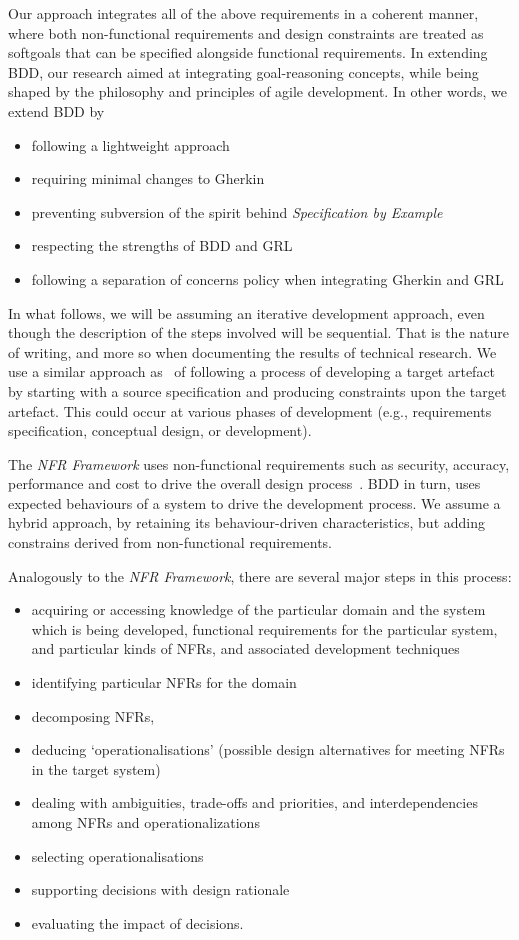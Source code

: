 \documentclass[dissertation,final]{softeng}
\begin{document}
Our approach integrates all of the above requirements in a coherent manner, where both non-functional requirements and design constraints are treated as softgoals that can be specified alongside functional requirements. In extending BDD, our research aimed at integrating goal-reasoning concepts, while being shaped by the philosophy and principles of agile development. In other words, we extend BDD by 

\begin{itemize}
\item following a lightweight approach
\item requiring minimal changes to Gherkin
\item preventing subversion of the spirit behind \emph{Specification by Example}
\item respecting the strengths of BDD and GRL
\item following a separation of concerns policy when integrating Gherkin and GRL
\end{itemize}

In what follows, we will be assuming an iterative development approach, even though the description of the steps involved will be sequential. That is the nature of writing, and more so when documenting the results of technical research. We use a similar approach as~\citet{Chung2000} of following a process of developing a target artefact by starting with a source specification and producing constraints upon the target artefact. This could occur at various phases of development (e.g., requirements specification, conceptual design, or development).

The \emph{NFR Framework} uses non-functional requirements such as security, accuracy, performance and cost to drive the overall design process~\citep{Chung2000}. BDD in turn, uses expected behaviours of a system to drive the development process. We assume a hybrid approach, by retaining its behaviour-driven characteristics, but adding constrains derived from non-functional requirements.
\clearpage

Analogously to the \emph{NFR Framework}, there are several major steps in this process:
\begin{itemize}
\item acquiring or accessing knowledge of the particular domain and the system which is being developed, functional requirements for the particular system, and particular kinds of NFRs, and associated development techniques
\item identifying particular NFRs for the domain
\item decomposing NFRs,
\item deducing `operationalisations' (possible design alternatives for meeting NFRs in the target system)
\item dealing with ambiguities, trade-offs and priorities, and interdependencies among NFRs and operationalizations
\item selecting operationalisations
\item supporting decisions with design rationale
\item evaluating the impact of decisions.
\end{itemize}
\end{document}
